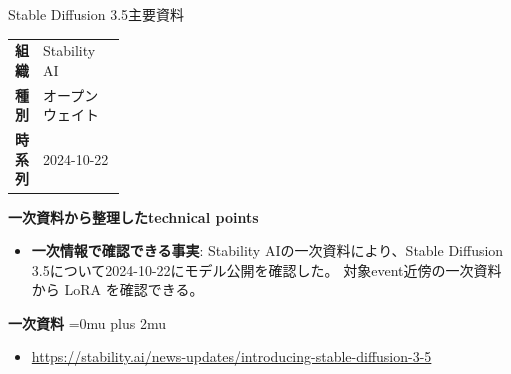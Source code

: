 \begin{technicalnote}{Stable Diffusion 3.5}{主要資料}
\begingroup
\begin{tabularx}{\linewidth}{@{}>{\bfseries}p{0.22\linewidth}X@{}}
組織 & Stability AI \\
種別 & オープンウェイト \\
時系列 & 2024-10-22 \\
\end{tabularx}
\smallskip
{\bfseries 一次資料から整理したtechnical points}
\begin{itemize}[leftmargin=1.5em,itemsep=0.35em]
\item \textbf{一次情報で確認できる事実}: Stability AIの一次資料により、Stable Diffusion 3.5について2024-10-22にモデル公開を確認した。 対象event近傍の一次資料から LoRA を確認できる。
\end{itemize}
\begin{minipage}{\linewidth}
\begin{samepage}
{\bfseries 一次資料}
\begingroup\sloppy
\Urlmuskip=0mu plus 2mu\relax
\begin{itemize}[leftmargin=1.5em,itemsep=0.25em]
\item {\scriptsize\url{https://stability.ai/news-updates/introducing-stable-diffusion-3-5}}
\end{itemize}
\endgroup
\end{samepage}
\end{minipage}
\endgroup
\end{technicalnote}
\medskip


